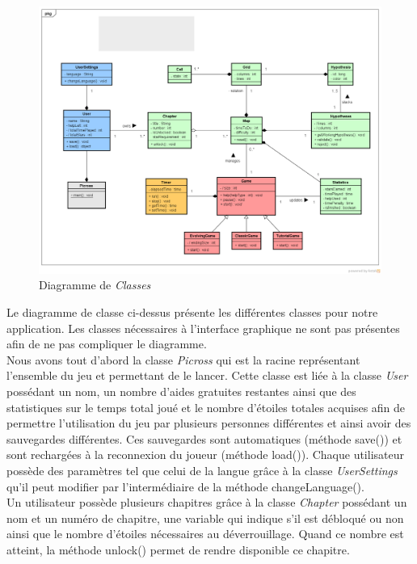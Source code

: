 \documentclass{report}
\begin{document}
    \begin{figure}[H]
	\caption{Diagramme de \textit{Classes}}
	\includegraphics[width=17cm]{../UML/Class_diagram/DiagrammeClasse2b.png}
    \end{figure}
    
    	
		Le diagramme de classe ci-dessus présente les différentes classes pour notre application. Les classes nécessaires à l’interface graphique ne sont pas présentes afin de ne pas compliquer le diagramme.\\
	Nous avons tout d’abord la classe \textit{Picross} qui est la racine représentant l’ensemble du jeu et permettant de le lancer. Cette classe est liée à la classe \textit{User} possédant un nom, un nombre d’aides gratuites restantes ainsi que des statistiques sur le temps total joué et le nombre d’étoiles totales acquises afin de permettre l’utilisation du jeu par plusieurs personnes différentes et ainsi  avoir des sauvegardes différentes. Ces sauvegardes sont automatiques (méthode save()) et sont rechargées à la reconnexion du joueur (méthode load()). Chaque utilisateur possède des paramètres tel que celui de la langue grâce à la classe \textit{UserSettings} qu’il peut modifier par l’intermédiaire de la méthode  changeLanguage().\\
	Un utilisateur possède plusieurs chapitres grâce à la classe \textit{Chapter} possédant un nom et un numéro de chapitre, une variable qui indique s’il est débloqué ou non ainsi que le nombre d’étoiles nécessaires au déverrouillage. Quand ce nombre est atteint, la méthode unlock() permet de rendre disponible ce chapitre.
	\vspace{12pt}
	
\end{document}
